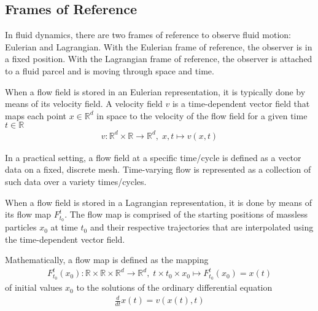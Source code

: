 \setlength{\belowdisplayskip}{0pt} \setlength{\belowdisplayshortskip}{0pt}
\setlength{\abovedisplayskip}{0pt} \setlength{\abovedisplayshortskip}{0pt}

\subsection{Frames of Reference}
%
In fluid dynamics, there are two frames of reference to observe fluid motion: Eulerian and Lagrangian.
%
With the Eulerian frame of reference, the observer is in a fixed position.
%
With the Lagrangian frame of reference, the observer is attached to a fluid parcel and is moving through space and time.

%
When a flow field is stored in an Eulerian representation, it is typically done by means of its velocity field.
%
A velocity field $v$ is a time-dependent vector field that maps each point $x\in \mathbb R^d$ in space to the velocity of the flow field for a given time $t\in \mathbb R$
%
\begin{eqnarray}
{v} : \mathbb R^d \times \mathbb R \to \mathbb R^d,\; x,t \mapsto v(x,t)
\end{eqnarray}

%
In a practical setting, a flow field at a specific time/cycle is defined as a vector data on a fixed, discrete mesh.
%
Time-varying flow is represented as a collection of such data over a variety times/cycles.


When a flow field is stored in a Lagrangian representation, it is done by means of its flow map $F_{t_0}^{t}$.
%
The flow map is comprised of the starting positions of massless particles $x_0$ at time $t_0$ and their respective trajectories that are interpolated using the time-dependent vector field.

Mathematically, a flow map is defined as the mapping
\begin{eqnarray}
F_{t_0}^{t}(x_0):\mathbb R \times \mathbb R \times \mathbb R^d \to \mathbb R^d,\; t \times t_0 \times x_0 \mapsto F_{t_0}^{t}(x_0) = x(t)
\end{eqnarray}
%
of initial values $x_0$ to the solutions of the ordinary differential equation
%
\begin{eqnarray}
\frac{d}{dt}x(t) = v(x(t),t)
\end{eqnarray}


